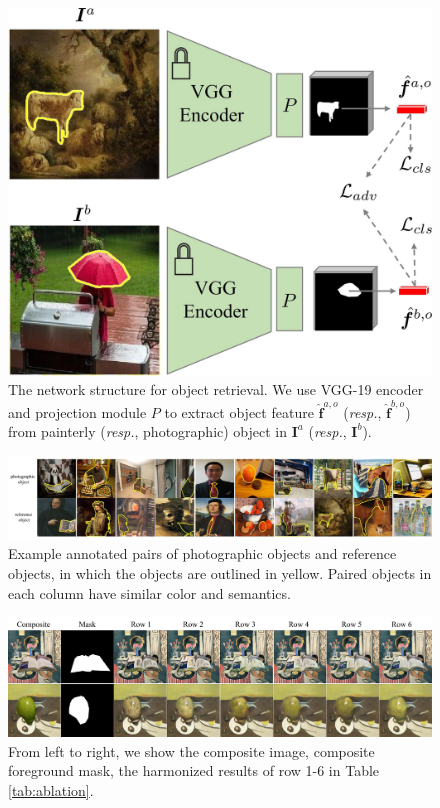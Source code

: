 \documentclass[letterpaper]{article} %
\begin{document}
\begin{figure}[t]
\centering
\includegraphics[width=0.8\linewidth]{figures/object_retrieval.jpg}
\caption{The network structure for object retrieval. We use VGG-19 \cite{VGG19} encoder and projection module $P$ to extract object feature $\hat{\bm{f}}^{a,o}$ (\emph{resp.}, $\hat{\bm{f}}^{b,o}$) from  painterly (\emph{resp.}, photographic) object in $\bm{I}^a$ (\emph{resp.}, $\bm{I}^b$). }
\label{fig:object_retrieval}
\end{figure}



\begin{figure}[t]
\centering
\includegraphics[width=0.99\linewidth]{figures/reference_objects_supp.jpg}
\caption{Example annotated pairs of photographic objects and reference objects, in which the objects are outlined in yellow. Paired objects in each column have similar color and semantics.}
\label{fig:reference_object_supp}
\end{figure}

\begin{figure}[t]
\centering
\includegraphics[width=0.95\linewidth]{figures/ablation_studies.jpg}
\caption{From left to right, we show the composite image, composite foreground mask, the harmonized results of row 1-6 in Table \ref{tab:ablation}.}
\label{fig:ablation_studies}
\end{figure}
\end{document}
